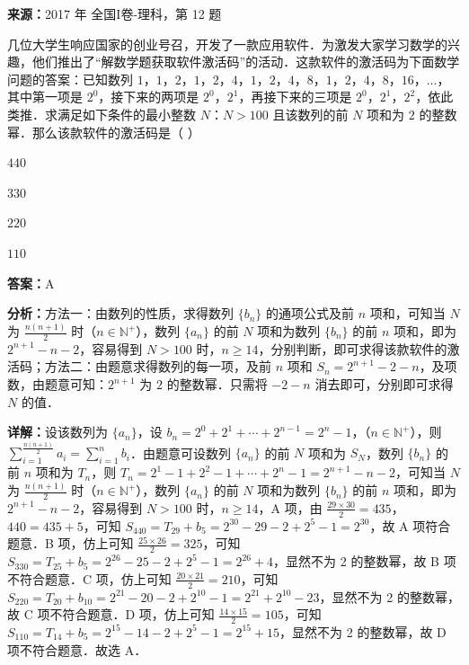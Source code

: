 \begin{question}[points=5]
\textbf{来源：}2017 年 全国I卷-理科，第 12 题\par
几位大学生响应国家的创业号召，开发了一款应用软件．为激发大家学习数学的兴趣，他们推出了“解数学题获取软件激活码”的活动．这款软件的激活码为下面数学问题的答案：已知数列 $1$，$1$，$2$，$1$，$2$，$4$，$1$，$2$，$4$，$8$，$1$，$2$，$4$，$8$，$16$，$\ldots$，其中第一项是 $2^0$，接下来的两项是 $2^0$，$2^1$，再接下来的三项是 $2^0$，$2^1$，$2^2$，依此类推．求满足如下条件的最小整数 $N$：$N>100$ 且该数列的前 $N$ 项和为 $2$ 的整数幂．那么该款软件的激活码是（ ）
\begin{choices}
  \item $440$
  \item $330$
  \item $220$
  \item $110$
\end{choices}
\begin{solution}
\textbf{答案：}A

\textbf{分析：}方法一：由数列的性质，求得数列 $\{b_n\}$ 的通项公式及前 $n$ 项和，可知当 $N$ 为 $\frac{n(n+1)}{2}$ 时（$n\in\mathbb{N}^+$），数列 $\{a_n\}$ 的前 $N$ 项和为数列 $\{b_n\}$ 的前 $n$ 项和，即为 $2^{n+1}-n-2$，容易得到 $N>100$ 时，$n\geq 14$，分别判断，即可求得该款软件的激活码；方法二：由题意求得数列的每一项，及前 $n$ 项和 $S_n=2^{n+1}-2-n$，及项数，由题意可知：$2^{n+1}$ 为 $2$ 的整数幂．只需将 $-2-n$ 消去即可，分别即可求得 $N$ 的值．

\textbf{详解：}设该数列为 $\{a_n\}$，设 $b_n=2^0+2^1+\cdots+2^{n-1}=2^n-1$，（$n\in\mathbb{N}^+$），则 $\sum_{i=1}^{\frac{n(n+1)}{2}} a_i = \sum_{i=1}^n b_i$．由题意可设数列 $\{a_n\}$ 的前 $N$ 项和为 $S_N$，数列 $\{b_n\}$ 的前 $n$ 项和为 $T_n$，则 $T_n=2^1-1+2^2-1+\cdots+2^n-1=2^{n+1}-n-2$，可知当 $N$ 为 $\frac{n(n+1)}{2}$ 时（$n\in\mathbb{N}^+$），数列 $\{a_n\}$ 的前 $N$ 项和为数列 $\{b_n\}$ 的前 $n$ 项和，即为 $2^{n+1}-n-2$，容易得到 $N>100$ 时，$n\geq 14$，A 项，由 $\frac{29\times30}{2}=435$，$440=435+5$，可知 $S_{440}=T_{29}+b_5=2^{30}-29-2+2^5-1=2^{30}$，故 A 项符合题意．B 项，仿上可知 $\frac{25\times26}{2}=325$，可知 $S_{330}=T_{25}+b_5=2^{26}-25-2+2^5-1=2^{26}+4$，显然不为 2 的整数幂，故 B 项不符合题意．C 项，仿上可知 $\frac{20\times21}{2}=210$，可知 $S_{220}=T_{20}+b_{10}=2^{21}-20-2+2^{10}-1=2^{21}+2^{10}-23$，显然不为 2 的整数幂，故 C 项不符合题意．D 项，仿上可知 $\frac{14\times15}{2}=105$，可知 $S_{110}=T_{14}+b_5=2^{15}-14-2+2^5-1=2^{15}+15$，显然不为 2 的整数幂，故 D 项不符合题意．故选 A．
\end{solution}
\end{question}

